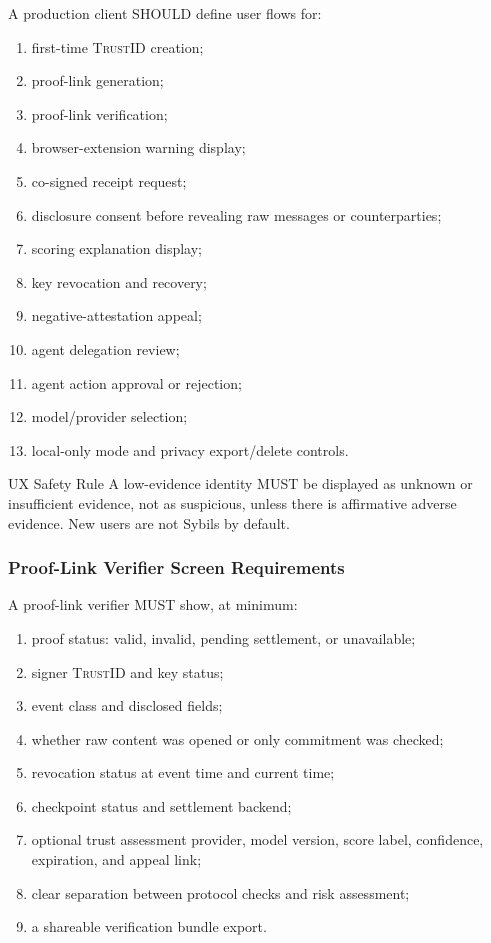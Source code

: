 \documentclass[11pt]{article}
\newcommand{\TrustID}{\textsc{TrustID}}
\begin{document}
A production client SHOULD define user flows for:

\begin{enumerate}
    \item first-time \TrustID{} creation;
    \item proof-link generation;
    \item proof-link verification;
    \item browser-extension warning display;
    \item co-signed receipt request;
    \item disclosure consent before revealing raw messages or counterparties;
    \item scoring explanation display;
    \item key revocation and recovery;
    \item negative-attestation appeal;
    \item agent delegation review;
    \item agent action approval or rejection;
    \item model/provider selection;
    \item local-only mode and privacy export/delete controls.
\end{enumerate}

\begin{warningbox}{UX Safety Rule}
A low-evidence identity MUST be displayed as unknown or insufficient evidence, not as suspicious, unless there is affirmative adverse evidence. New users are not Sybils by default.
\end{warningbox}

\subsubsection{Proof-Link Verifier Screen Requirements}

A proof-link verifier MUST show, at minimum:

\begin{enumerate}
    \item proof status: valid, invalid, pending settlement, or unavailable;
    \item signer \TrustID{} and key status;
    \item event class and disclosed fields;
    \item whether raw content was opened or only commitment was checked;
    \item revocation status at event time and current time;
    \item checkpoint status and settlement backend;
    \item optional trust assessment provider, model version, score label, confidence, expiration, and appeal link;
    \item clear separation between protocol checks and risk assessment;
    \item a shareable verification bundle export.
\end{enumerate}
\end{document}
